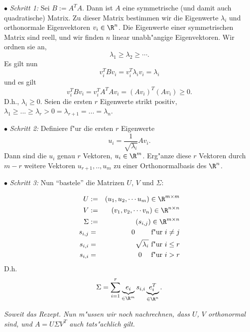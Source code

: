 $\bullet$ {\it Schritt 1: } Sei $B := A^T A$. Dann ist $A$ eine symmetrische 
(und damit auch quadratische) Matrix. Zu dieser Matrix bestimmen wir die 
Eigenwerte $\lambda_i$ und orthonormale Eigenvektoren $v_i\in \R^n$. 
Die Eigenwerte einer symmetrischen Matrix sind reell, und wir finden $n$ linear 
unabh"angige Eigenvektoren. Wir ordnen sie an,
$$ \lambda_1\geq \lambda_2\geq\cdots.$$
Es gilt nun
$$ v_i^T B v_i = v_i^T \lambda_i v_i = \lambda_i$$
und es gilt
$$ v_i^T B v_i = v_i^TA^T A v_i = (A v_i)^T (A v_i)\geq 0.$$
D.h., $\lambda_i\geq 0$. Seien die ersten $r$ Eigenwerte strikt positiv, 
$\lambda_1\geq ...\geq \lambda_r>0=\lambda_{r+1}=...=\lambda_n$. 

$\bullet$ {\it Schritt 2: } Definiere f"ur die ersten $r$ Eigenwerte
$$ u_i = \frac 1 {\sqrt{\lambda_i}} Av_i.$$
Dann sind die $u_i$ genau $r$ Vektoren, $u_i\in \R^m$. Erg"anze diese $r$ Vektoren durch
$m-r$ weitere Vektoren
$u_{r+1},..,u_m$  zu einer Orthonormalbasis des $\R^n$. 
\par\medskip

$\bullet$ {\it Schritt 3: } Nun ``bastele'' die Matrizen $U$, $V$ und $\Sigma$:\par
\begin{eqnarray*}
U & := &  (u_1, u_2, \cdots u_m)\in \R^{m\times m} \\
V & := &   (v_1, v_2, \cdots v_n) \in\R^{n\times n}\\
\Sigma & := & (s_{i,j})\in \R^{m\times n}\\
s_{i,j} & = & 0 \qquad\mbox{ f"ur } i\not = j\\
s_{i,i} & = & \sqrt{\lambda_i}\mbox{ f"ur } i\leq r\\
s_{i,i} & = & 0 \quad\mbox{ f"ur } i>r\\
\end{eqnarray*}
D.h.
$$ \Sigma = \sum_{i=1}^r \underbrace{e_i}_{{\scriptsize \in\R^m}} s_{i,i} \underbrace{e_i^T}_{{\scriptsize \in\R^n}}.$$

{\it Soweit das Rezept. Nun m"ussen wir noch nachrechnen, dass $U$, 
$V$ orthonormal sind, und $A = U \Sigma V^T$  auch tats"achlich gilt.}

